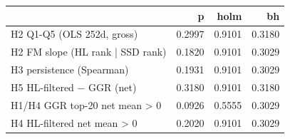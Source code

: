 \begin{tabular}{lrrr}
\toprule
 & p & holm & bh \\
\midrule
H2 Q1-Q5 (OLS 252d, gross) & 0.2997 & 0.9101 & 0.3180 \\
H2 FM slope (HL rank | SSD rank) & 0.1820 & 0.9101 & 0.3029 \\
H3 persistence (Spearman) & 0.1931 & 0.9101 & 0.3029 \\
H5 HL-filtered − GGR (net) & 0.3180 & 0.9101 & 0.3180 \\
H1/H4 GGR top-20 net mean > 0 & 0.0926 & 0.5555 & 0.3029 \\
H4 HL-filtered net mean > 0 & 0.2020 & 0.9101 & 0.3029 \\
\bottomrule
\end{tabular}
